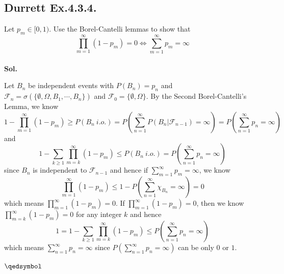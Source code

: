 \documentclass[lang=en,11pt,a4paper,citestyle =authoryear]{elegantpaper}
\newcommand{\prvd}{$\hfill \qedsymbol$}
\newcommand{\F}{\mathcal{F}}
\begin{document}
\subsection*{Durrett Ex.4.3.4.} 
Let $p_m \in [0, 1)$. Use the Borel-Cantelli lemmas to show that
\[
\prod_{m=1}^{\infty}(1-p_m) = 0\iff \sum\limits_{m=1}^{\infty}p_m = \infty
\]
\vspace{0.5em}\\
\textbf{Sol.} \par
Let $B_n$ be independent events with $P(B_n) = p_n$ and $\F_n = \sigma(\{\emptyset, \Omega,B_1,\cdots,B_n \})$ and $\F_0 = \{\emptyset,\Omega\}$. By the Second Borel-Cantelli's Lemma, we know
\[
1 - \prod_{m=1}^{\infty}(1-p_m) \geq P(B_n\ i.o.) = P(\sum\limits_{n=1}^{\infty} P(B_n|\F_{n-1}) = \infty) = P(\sum\limits_{n=1}^{\infty} p_n = \infty)
\]
and
\[
1 - \sum\limits_{k\geq 1}\prod_{m=k}^{\infty}(1-p_m) \leq P(B_n\ i.o.) = P(\sum\limits_{n=1}^{\infty} p_n = \infty)
\]
since $B_n$ is independent to $\F_{n-1}$ and hence if $\sum\limits_{m=1}^{\infty} p_m = \infty$, we know
\[
\prod_{m=1}^{\infty}(1-p_m) \leq 1 - P(\sum\limits_{n=1}^{\infty} \chi_{B_n} = \infty) = 0
\]
which means $\prod_{m=1}^{\infty}(1-p_m) = 0$. If $\prod_{m=1}^{\infty}(1-p_m) = 0$, then we know $\prod_{m=k}^{\infty}(1-p_m) = 0$ for any integer $k$ and hence
\[1 = 1 - \sum\limits_{k\geq 1}\prod_{m=k}^{\infty}(1-p_m) \leq  P(\sum\limits_{n=1}^{\infty} p_n = \infty)\]
which means $\sum\limits_{n=1}^{\infty} p_n = \infty$ since $P(\sum\limits_{n=1}^{\infty} p_n = \infty)$ can be only $0$ or $1$.

\prvd
\vspace{0.5em}

\addappheadtotoc
\end{document}
